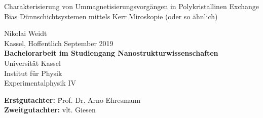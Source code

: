 \begin{titlepage} 
      \sffamily                                                     
\begin{center}                

{\Large \bfseries                                                                 
  \begin{onehalfspace}                                                           
   Charakterisierung von Ummagnetisierungsvorgängen in Polykristallinen Exchange Bias Dünnschichtsystemen mittels Kerr Miroskopie (oder so ähnlich)  \\[1cm]
  \end{onehalfspace}}                                                               

{\Large
Nikolai Weidt\\[0.5cm]
Kassel, Hoffentlich September 2019 \\[3cm]

{\bfseries Bachelorarbeit im Studiengang Nanostrukturwissenschaften}\\[0.5cm]       
Universität Kassel\\                                                                       
Institut für Physik\\                                                  
Experimentalphysik IV\\[1cm]}                                                                                                                                         
                                                                                          
\end{center}

\vfill

{\large                                                                                                                                                         
\begin{tabbing}
	\textbf{Erstgutachter:} \hspace{1cm} \= Prof. Dr. Arno Ehresmann \\
	\textbf{Zweitgutachter:} \> vlt. Giesen\\
\end{tabbing}}                                                 

\end{titlepage}    

\restoregeometry
 
\SetBgContents{}      
